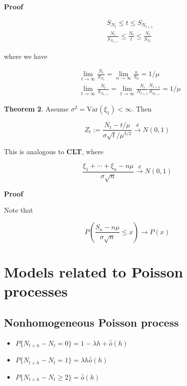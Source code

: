 \documentclass[12pt]{article}
\theoremstyle{nonumberbreak}
\begin{document}
\textbf{Proof} 

$$
\begin{aligned}
&S_{N_t} \le t \le S_{N_{t+1}} \\[8pt]
&\frac{N_t}{S_{N_{t+1}}} \le \frac{N_t}{t} \le \frac{N_t}{S_{N_t}} 
\end{aligned}
$$

where we have

$$
\begin{aligned}
&\lim_{t\to\infty} \frac{N_t}{S_{N_t}} = \lim_{n\to\infty} \frac{n}{S_n} = 1/\mu \\[8pt]
&\lim_{t\to\infty} \frac{N_t}{S_{N_{t+1}}} = 
\lim_{t\to\infty} \frac{N_t}{N_{t+1}} \frac{N_{t+1}}{S_{N_{t+1}}} = 1/\mu
\end{aligned}
$$


\begin{theorem}
\textbf{Theorem 2}. Assume $\sigma^2 = \mathrm{Var} (\xi_1) < \infty$. Then

$$
Z_t := \frac{N_t - t/\mu}{\sigma \sqrt{t} / \mu^{3/2}} \overset{d}{\to} N(0,1)
$$

This is analogous to \textbf{CLT}, where 

$$
\frac{\xi_1 + \cdots + \xi_n - n\mu}{\sigma \sqrt{n}} \overset{d}{\to}  N(0,1)
$$
\end{theorem}


\textbf{Proof} 

Note that 

$$
P \left( \frac{S_n - n\mu}{\sigma \sqrt{n}} \le x \right) \to P(x)
$$



\pagebreak
\section{Models related to Poisson processes}

\subsection{Nonhomogeneous Poisson process}

\begin{itemize}
	\item $P\{ N_{t+h} - N_t = 0 \} = 1 - \lambda h + \bar{\bar{o}}(h)$
	\item $P\{ N_{t+h} - N_t = 1 \} = \lambda h \bar{\bar{o}}(h)$
	\item $P\{ N_{t+h} - N_t \ge 2 \} = \bar{\bar{o}}(h)$
\end{itemize}
\end{document}

